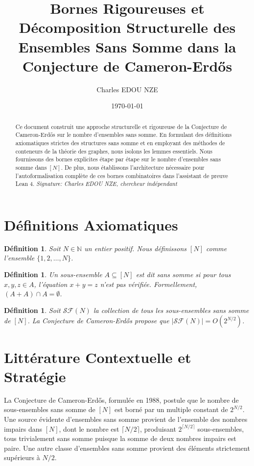 \documentclass[12pt, a4paper]{article}
\title{Bornes Rigoureuses et D\'ecomposition Structurelle des Ensembles Sans Somme dans la Conjecture de Cameron-Erd\H{o}s}
\author{Charles EDOU NZE}
\date{\today}
\newtheorem{definition}[theorem]{D\'efinition}
\begin{document}
\maketitle

\begin{abstract}
Ce document construit une approche structurelle et rigoureuse de la Conjecture de Cameron-Erd\H{o}s sur le nombre d'ensembles sans somme. En formulant des d\'efinitions axiomatiques strictes des structures sans somme et en employant des m\'ethodes de conteneurs de la th\'eorie des graphes, nous isolons les lemmes essentiels. Nous fournissons des bornes explicites \'etape par \'etape sur le nombre d'ensembles sans somme dans $[N]$. De plus, nous \'etablissons l'architecture n\'ecessaire pour l'autoformalisation compl\`ete de ces bornes combinatoires dans l'assistant de preuve Lean 4.
\vfill
\noindent \textit{Signature: Charles EDOU NZE, chercheur ind\'ependant}
\end{abstract}

\tableofcontents
\newpage

\section{D\'efinitions Axiomatiques}

\begin{definition}
Soit $N \in \mathbb{N}$ un entier positif. Nous d\'efinissons $[N]$ comme l'ensemble $\{1, 2, \dots, N\}$.
\end{definition}

\begin{definition}
Un sous-ensemble $A \subseteq [N]$ est dit sans somme si pour tous $x, y, z \in A$, l'\'equation $x + y = z$ n'est pas v\'erifi\'ee. Formellement, $(A + A) \cap A = \emptyset$.
\end{definition}

\begin{definition}
Soit $\mathcal{SF}(N)$ la collection de tous les sous-ensembles sans somme de $[N]$. La Conjecture de Cameron-Erd\H{o}s propose que $|\mathcal{SF}(N)| = O(2^{N/2})$.
\end{definition}

\section{Litt\'erature Contextuelle et Strat\'egie}

La Conjecture de Cameron-Erd\H{o}s, formul\'ee en 1988, postule que le nombre de sous-ensembles sans somme de $[N]$ est born\'e par un multiple constant de $2^{N/2}$. Une source \'evidente d'ensembles sans somme provient de l'ensemble des nombres impairs dans $[N]$, dont le nombre est $\lceil N/2 \rceil$, produisant $2^{\lceil N/2 \rceil}$ sous-ensembles, tous trivialement sans somme puisque la somme de deux nombres impairs est paire. Une autre classe d'ensembles sans somme provient des \'el\'ements strictement sup\'erieurs \`a $N/2$.
\end{document}

